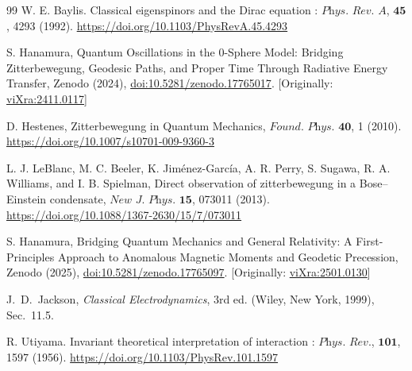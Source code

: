 \documentclass[%
 reprint,
 amsmath,amssymb,
 aps,
]{revtex4-1}
\numberwithin{equation}{section}%
\begin{document}
\begin{thebibliography}{99}
 W. E. Baylis. Classical eigenspinors and the Dirac equation : $\textit{Phys. Rev. A}$, $\textbf{45}$, 4293 (1992). \href{https://doi.org/10.1103/PhysRevA.45.4293}{https://doi.org/10.1103/PhysRevA.45.4293}

S. Hanamura, Quantum Oscillations in the 0-Sphere Model: Bridging Zitterbewegung, Geodesic Paths, and Proper Time Through Radiative Energy Transfer, Zenodo (2024), \href{https://doi.org/10.5281/zenodo.17765017}{doi:10.5281/zenodo.17765017}. [Originally: \href{https://vixra.org/abs/2411.0117}{viXra:2411.0117}]

 D. Hestenes, 
Zitterbewegung in Quantum Mechanics, 
$\textit{Found. Phys.}$ $\textbf{40}$, 1 (2010). \href{https://doi.org/10.1007/s10701-009-9360-3}{https://doi.org/10.1007/s10701-009-9360-3}

 L. J. LeBlanc, M. C. Beeler, K. Jiménez-García, A. R. Perry, S. Sugawa, 
R. A. Williams, and I. B. Spielman, 
Direct observation of zitterbewegung in a Bose–Einstein condensate, 
$\textit{New J. Phys.}$ $\textbf{15}$, 073011 (2013). \href{https://doi.org/10.1088/1367-2630/15/7/073011}{https://doi.org/10.1088/1367-2630/15/7/073011}

S. Hanamura, Bridging Quantum Mechanics and General Relativity: A First-Principles Approach to Anomalous Magnetic Moments and Geodetic Precession, Zenodo (2025), \href{https://doi.org/10.5281/zenodo.17765097}{doi:10.5281/zenodo.17765097}. [Originally: \href{https://vixra.org/abs/2501.0130}{viXra:2501.0130}]

 J.~D.~Jackson, \textit{Classical Electrodynamics}, 3rd ed. (Wiley, New York, 1999), Sec.~11.5.

 R. Utiyama. Invariant theoretical interpretation of interaction : $\textit{Phys. Rev.}$, $\textbf{101}$, 1597 (1956). \href{https://doi.org/10.1103/PhysRev.101.1597}{https://doi.org/10.1103/PhysRev.101.1597}

\end{thebibliography}
\end{document}
